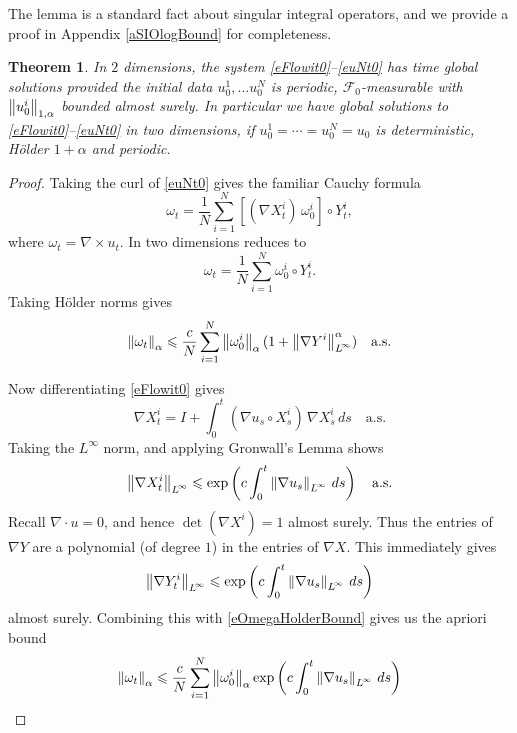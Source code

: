 \documentclass[final]{amsart}%
\newcommand{\mceulert}{\eqref{eFlowit0}--\eqref{euNt0}\xspace}
\newcommand{\grad}{\nabla}
\newcommand{\divergence}{\grad \cdot}
\newcommand{\curl}{\grad \times}
\renewcommand{\leq}{\leqslant}
\newcommand{\F}{\mathcal{F}}
\newcommand{\as}{\text{a.s.}}
\newif\iftextstyle
\newcommand{\norm}[1]{\iftextstyle\lVert#1\rVert\else\left\lVert#1\right\rVert\fi}
\newcommand{\holdernorm}[3]{\norm{#1}_{\ifx0#2{#3}\else{#2,#3}\fi}}
\newcommand{\lpnorm}[2]{\norm{#1}_{\smash{L^{\!#2}_{\vphantom{h}}}\vphantom{L^{\!#2}}}}
\newcommand{\linfnorm}[1]{\lpnorm{#1}{\infty}}
\numberwithin{equation}{section}
\newtheorem{theorem}{Theorem}[section]
\theoremstyle{definition}
\theoremstyle{remark}
\begin{document}
The lemma is a standard fact about singular integral operators, and we
provide a proof in Appendix \ref{aSIOlogBound} for completeness.

\begin{theorem}\label{t2DGlobalExistence}%
  In $2$ dimensions, the system \mceulert has time global solutions
  provided the initial data $u^1_0, \dots u^N_0$ is periodic,
  $\F_0$-measurable with $\holdernorm{u^i_0}{1}{\alpha}$ bounded
  almost surely. In particular we have global solutions to \mceulert
  in two dimensions, if $u^1_0 = \cdots = u^N_0 = u_0$ is
  deterministic, H\"older $1 + \alpha$ and periodic.
\end{theorem}%
\begin{proof}%
Taking the curl of \eqref{euNt0} gives the familiar Cauchy formula \cites{ele,detsns,sperturb}
\begin{equation}\label{eCauchy3D}
  \omega_t = \frac{1}{N} \sum_{i=1}^N \left[ (\grad X^i_t) \, \omega^i_0 \right] \circ Y^i_t,
\end{equation}
where $\omega_t = \curl u_t$. In two dimensions reduces to
\begin{equation}\label{eCauchy2D}
\omega_t = \frac{1}{N} \sum_{i=1}^N \omega^i_0 \circ Y^i_t.
\end{equation}
Taking H\"older norms gives
\begin{equation}\label{eOmegaHolderBound}
  \holdernorm{\omega_t}{0}{\alpha} \leq \frac{c}{N} \sum_{i=1}^N
  \holdernorm{\omega^i_0}{0}{\alpha} (1 + \linfnorm{\grad Y^i}^\alpha)
  \quad\as 
\end{equation}

Now differentiating \eqref{eFlowit0} gives
$$
\grad X^i_t = I + \int_0^t (\grad u_s \circ X^i_s) \, \grad X^i_s \, ds \quad\as
$$
Taking the $L^\infty$ norm, and applying Gronwall's Lemma shows
$$
\linfnorm{\grad X^i_t} \leq \exp\left( c \int_0^t \linfnorm{ \grad u_s
  } \, ds \right) \quad\as 
$$
Recall $\divergence u = 0$, and hence $\det(\grad X^i) = 1$ almost
surely. Thus the entries of $\grad Y$ are a polynomial (of degree $1$)
in the entries of $\grad X$. This immediately gives
\begin{equation}\label{eGradYiLinfBound}
\linfnorm{\grad Y^i_t} \leq \exp\left( c \int_0^t \linfnorm{ \grad u_s } \, ds \right)
\end{equation}
almost surely. Combining this with \eqref{eOmegaHolderBound} gives us the apriori bound
\begin{equation}\label{eOmegaGradUBound}
  \holdernorm{\omega_t}{0}{\alpha} \leq \frac{c}{N} \sum_{i=1}^N
  \holdernorm{\omega^i_0}{0}{\alpha} \exp\left( c \int_0^t \linfnorm{
      \grad u_s } \, ds \right) 
\end{equation}


\end{proof}
\end{document}
